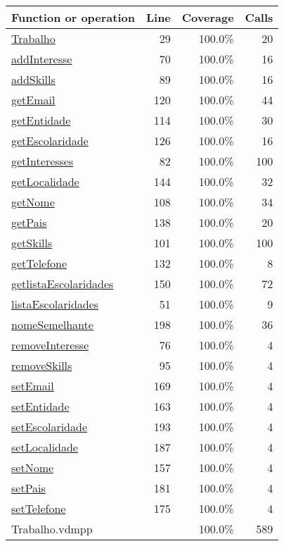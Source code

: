 \begin{longtable}{|l|r|r|r|}
\hline
Function or operation & Line & Coverage & Calls \\
\hline
\hline
\hyperref[Trabalho:29]{Trabalho} & 29&100.0\% & 20 \\
\hline
\hyperref[addInteresse:70]{addInteresse} & 70&100.0\% & 16 \\
\hline
\hyperref[addSkills:89]{addSkills} & 89&100.0\% & 16 \\
\hline
\hyperref[getEmail:120]{getEmail} & 120&100.0\% & 44 \\
\hline
\hyperref[getEntidade:114]{getEntidade} & 114&100.0\% & 30 \\
\hline
\hyperref[getEscolaridade:126]{getEscolaridade} & 126&100.0\% & 16 \\
\hline
\hyperref[getInteresses:82]{getInteresses} & 82&100.0\% & 100 \\
\hline
\hyperref[getLocalidade:144]{getLocalidade} & 144&100.0\% & 32 \\
\hline
\hyperref[getNome:108]{getNome} & 108&100.0\% & 34 \\
\hline
\hyperref[getPais:138]{getPais} & 138&100.0\% & 20 \\
\hline
\hyperref[getSkills:101]{getSkills} & 101&100.0\% & 100 \\
\hline
\hyperref[getTelefone:132]{getTelefone} & 132&100.0\% & 8 \\
\hline
\hyperref[getlistaEscolaridades:150]{getlistaEscolaridades} & 150&100.0\% & 72 \\
\hline
\hyperref[listaEscolaridades:51]{listaEscolaridades} & 51&100.0\% & 9 \\
\hline
\hyperref[nomeSemelhante:198]{nomeSemelhante} & 198&100.0\% & 36 \\
\hline
\hyperref[removeInteresse:76]{removeInteresse} & 76&100.0\% & 4 \\
\hline
\hyperref[removeSkills:95]{removeSkills} & 95&100.0\% & 4 \\
\hline
\hyperref[setEmail:169]{setEmail} & 169&100.0\% & 4 \\
\hline
\hyperref[setEntidade:163]{setEntidade} & 163&100.0\% & 4 \\
\hline
\hyperref[setEscolaridade:193]{setEscolaridade} & 193&100.0\% & 4 \\
\hline
\hyperref[setLocalidade:187]{setLocalidade} & 187&100.0\% & 4 \\
\hline
\hyperref[setNome:157]{setNome} & 157&100.0\% & 4 \\
\hline
\hyperref[setPais:181]{setPais} & 181&100.0\% & 4 \\
\hline
\hyperref[setTelefone:175]{setTelefone} & 175&100.0\% & 4 \\
\hline
\hline
Trabalho.vdmpp & & 100.0\% & 589 \\
\hline
\end{longtable}

